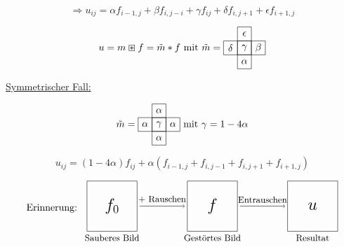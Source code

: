             \[\Rightarrow u_{ij} = \alpha f_{i-1,j} + \beta f_{i,j-i} + \gamma f_{ij} + \delta f_{i,j+1} + \epsilon f_{i+1,j}\]
        
            \begin{equation*}
                u = m \boxast f = \tilde m * f \text{ mit } \tilde m = \raisebox{-0.665cm}{\begin{tikzpicture}
                    \draw[step = 0.5] (0,0) grid (0.5,1.5);
                    \draw[step = 0.5] (-0.5,1) grid (1,0.5);
                    \draw (0.25,1.25) node {$\epsilon$};
                    \draw (0.25,0.75) node {$\gamma$};
                    \draw (0.25,0.25) node {$\alpha$};
                    \draw (-0.25,0.75) node {$\delta$};
                    \draw (0.75,0.75) node {$\beta$};
                \end{tikzpicture}}
            \end{equation*}
        
            \underline{Symmetrischer Fall:}
        
            \begin{equation*}
            \tilde m = \raisebox{-0.665cm}{\begin{tikzpicture}
                    \draw[step = 0.5] (0,0) grid (0.5,1.5);
                    \draw[step = 0.5] (-0.5,1) grid (1,0.5);
                    \draw (0.25,1.25) node {$\alpha$};
                    \draw (0.25,0.75) node {$\gamma$};
                    \draw (0.25,0.25) node {$\alpha$};
                    \draw (-0.25,0.75) node {$\alpha$};
                    \draw (0.75,0.75) node {$\alpha$};
                \end{tikzpicture}} \text{ mit } \gamma = 1 - 4 \alpha
            \end{equation*}
        
            \begin{equation}
                u_{ij} = (1 - 4 \alpha)f_{ij} + \alpha(f_{i-1,j} + f_{i,j-1} + f_{i,j+1} + f_{i+1,j})
            \end{equation}
        
            \begin{equation*}
                    \text{Erinnerung: } \raisebox{-1.2cm}{\begin{tikzpicture}[scale=0.9]
                        \draw (0,0) rectangle (2,2);
                        \draw (1,0) node[below] {\small Sauberes Bild};
                        \draw (1,1) node[] {\LARGE $f_0$};
                        \draw[->] (2.1,1) -- node[above] {\small $+$ Rauschen} (3.9,1);
                        \draw (4,0) rectangle (6,2);
                        \draw (5,0) node[below] {\small Gestörtes Bild};
                        \draw (5,1) node[] {\LARGE $f$};
                        \draw[->] (6.1,1) -- node[above] {\small Entrauschen} (7.9,1);
                        \draw (8,0) rectangle (10,2);                
                        \draw (9,0) node[below] {\small Resultat};
                        \draw (9,1) node[] {\LARGE $u$};
                    \end{tikzpicture}}
            \end{equation*}
        
